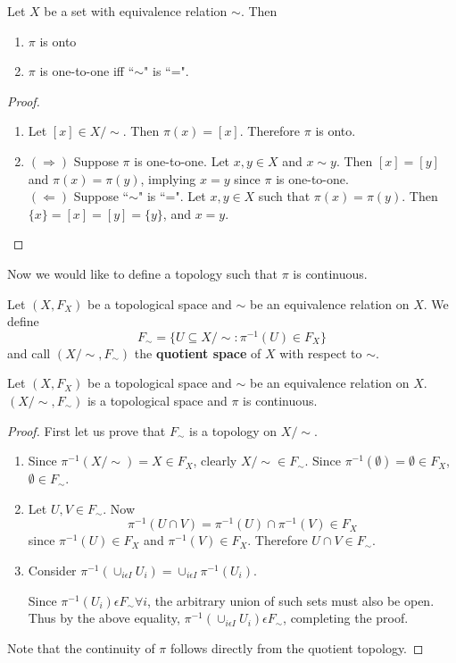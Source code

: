 \begin{tinyfact}
	Let $X$ be a set with equivalence relation $\sim$. Then 
	\begin{enumerate}
		\item $\pi$ is onto 
		\item $\pi$ is one-to-one iff ``$\sim$" is ``=". 
	\end{enumerate}
\end{tinyfact}
\begin{proof}
	\begin{enumerate}
		\item Let $[x] \in X / \sim$. Then $\pi(x) = [x]$. Therefore $\pi$ is onto. 
		\item $(\Rightarrow)$ Suppose $\pi$ is one-to-one. Let $x,y \in X$ and $x \sim y$. Then $[x] = [y]$ and $\pi(x) = \pi(y)$, implying $x = y$ since $\pi$ is one-to-one.\\
		$(\Leftarrow)$ Suppose ``$\sim$" is ``=". Let $x,y \in X$ such that $\pi(x) = \pi(y)$. Then $\{x\} = [x] = [y] = \{y\}$, and $x = y$. 
	\end{enumerate}
\end{proof}

Now we would like to define a topology such that $\pi$ is continuous. 
\begin{definition}
	Let $(X, F_X)$ be a topological space and $\sim$ be an equivalence relation on $X$. We define
	\[F_{\sim} = \{U \subseteq X / \sim : \pi^{-1}(U) \in F_X\}\]
	and call $(X / \sim, F_{\sim})$ the {\bf quotient space} of $X$ with respect to $\sim$. 
\end{definition}
\begin{smallfact}
	Let $(X, F_X)$ be a topological space and $\sim$ be an equivalence relation on $X$. $(X / \sim, F_{\sim})$ is a topological space and $\pi$ is continuous. 
\end{smallfact}
\begin{proof}
	First let us prove that $F_{\sim}$ is a topology on $X / \sim$. 
	\begin{enumerate}
		\item Since $\pi^{-1}(X / \sim) = X \in F_X$, clearly $X / \sim \in F_{\sim}$. Since $\pi^{-1}(\emptyset) = \emptyset \in F_X$, $\emptyset \in F_{\sim}$. 
		\item Let $U, V \in F_{\sim}$. Now $$\pi^{-1}(U \cap V) = \pi^{-1}(U) \cap \pi^{-1}(V) \in F_X$$ since $ \pi^{-1}(U) \in F_X$ and $\pi^{-1}(V) \in F_X$. Therefore $U \cap V \in F_{\sim}$. 
		\item Consider $\pi^{-1}(\cup_{i \epsilon I}U_{i}) = \cup_{i \epsilon I} \pi^{-1}(U_{i})$.
		
		Since $\pi^{-1}(U_{i}) \epsilon F_{\sim} \forall i$, the arbitrary union of such sets must also be open. Thus by the above equality, $\pi^{-1}(\cup_{i \epsilon I}U_{i}) \epsilon F_{\sim}$, completing the proof. 
	\end{enumerate}
	Note that the continuity of $\pi$ follows directly from the quotient topology. 
\end{proof}

